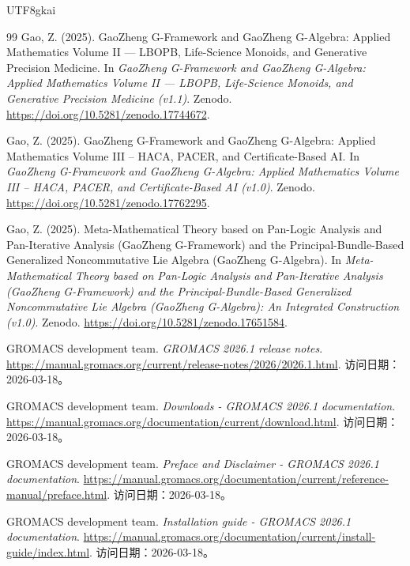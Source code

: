 \documentclass[12pt]{article}
\begin{document}
\begin{CJK*}{UTF8}{gkai}
\begin{thebibliography}{99}
Gao, Z. (2025).
\newblock GaoZheng G-Framework and GaoZheng G-Algebra: Applied Mathematics Volume II — LBOPB, Life-Science Monoids, and
  Generative Precision Medicine.
\newblock In \emph{GaoZheng G-Framework and GaoZheng G-Algebra: Applied Mathematics Volume II — LBOPB, Life-Science
  Monoids, and Generative Precision Medicine (v1.1)}.
\newblock Zenodo.
\newblock \url{https://doi.org/10.5281/zenodo.17744672}.


Gao, Z. (2025).
\newblock GaoZheng G-Framework and GaoZheng G-Algebra: Applied Mathematics Volume III – HACA, PACER, and
  Certificate-Based AI.
\newblock In \emph{GaoZheng G-Framework and GaoZheng G-Algebra: Applied Mathematics Volume III – HACA, PACER, and
  Certificate-Based AI (v1.0)}.
\newblock Zenodo.
\newblock \url{https://doi.org/10.5281/zenodo.17762295}.


Gao, Z. (2025).
\newblock Meta-Mathematical Theory based on Pan-Logic Analysis and
Pan-Iterative Analysis (GaoZheng G-Framework) and the
Principal-Bundle-Based Generalized Noncommutative Lie Algebra
(GaoZheng G-Algebra).
\newblock In \emph{Meta-Mathematical Theory based on Pan-Logic Analysis and
Pan-Iterative Analysis (GaoZheng G-Framework) and the
Principal-Bundle-Based Generalized Noncommutative Lie Algebra
(GaoZheng G-Algebra): An Integrated Construction (v1.0)}.
\newblock Zenodo.
\newblock \url{https://doi.org/10.5281/zenodo.17651584}.


GROMACS development team.
\newblock \emph{GROMACS 2026.1 release notes}.
\newblock \url{https://manual.gromacs.org/current/release-notes/2026/2026.1.html}. 访问日期：2026-03-18。

GROMACS development team.
\newblock \emph{Downloads - GROMACS 2026.1 documentation}.
\newblock \url{https://manual.gromacs.org/documentation/current/download.html}. 访问日期：2026-03-18。

GROMACS development team.
\newblock \emph{Preface and Disclaimer - GROMACS 2026.1 documentation}.
\newblock \url{https://manual.gromacs.org/documentation/current/reference-manual/preface.html}. 访问日期：2026-03-18。

GROMACS development team.
\newblock \emph{Installation guide - GROMACS 2026.1 documentation}.
\newblock \url{https://manual.gromacs.org/documentation/current/install-guide/index.html}. 访问日期：2026-03-18。


\end{thebibliography}
\end{CJK*}
\end{document}
